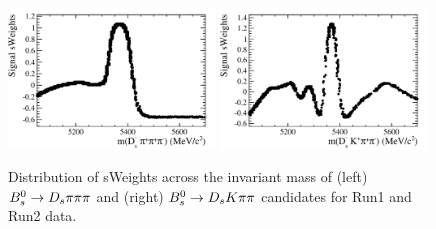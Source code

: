 \begin{figure}[h]
\includegraphics[height=7.cm,width=0.49\textwidth]{figs/norm_sweight_y11_phipi.pdf}
\includegraphics[height=7.cm,width=0.49\textwidth]{figs/signal_sweight_y11_phipi.pdf}
\caption{Distribution of sWeights across the invariant mass of (left) ${{B}^0_{s}}\rightarrow{\ensuremath{{D}_{s}}}{\ensuremath{\pi}}{\ensuremath{\pi}}{\ensuremath{\pi}}$ and (right) ${{B}^0_{s}}\rightarrow{\ensuremath{{D}_{s}}}{\ensuremath{K}}{\ensuremath{\pi}}{\ensuremath{\pi}}$ candidates for Run1 and Run2 data.}
\label{fig: sWeights}
\end{figure}

